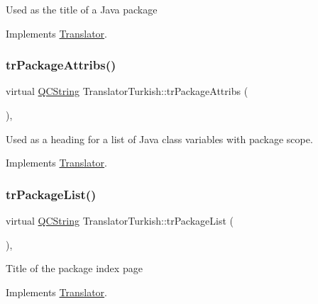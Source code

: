 Used as the title of a Java package 

Implements \mbox{\hyperlink{class_translator}{Translator}}.

\mbox{\label{class_translator_turkish_a78b79816b478ebd6d00b1bf38cfa324f}} 
\subsubsection{\texorpdfstring{trPackageAttribs()}{trPackageAttribs()}}
{\footnotesize\ttfamily virtual \mbox{\hyperlink{class_q_c_string}{Q\+C\+String}} Translator\+Turkish\+::tr\+Package\+Attribs (\begin{DoxyParamCaption}{ }\end{DoxyParamCaption})\hspace{0.3cm}{\ttfamily [inline]}, {\ttfamily [virtual]}}

Used as a heading for a list of Java class variables with package scope. 

Implements \mbox{\hyperlink{class_translator}{Translator}}.

\mbox{\label{class_translator_turkish_a22a3777d293bd5c514a51bff6c7c394d}} 
\subsubsection{\texorpdfstring{trPackageList()}{trPackageList()}}
{\footnotesize\ttfamily virtual \mbox{\hyperlink{class_q_c_string}{Q\+C\+String}} Translator\+Turkish\+::tr\+Package\+List (\begin{DoxyParamCaption}{ }\end{DoxyParamCaption})\hspace{0.3cm}{\ttfamily [inline]}, {\ttfamily [virtual]}}

Title of the package index page 

Implements \mbox{\hyperlink{class_translator}{Translator}}.

\mbox{\label{class_translator_turkish_a8761b27cb693cf905547df4b72e27aad}} 
